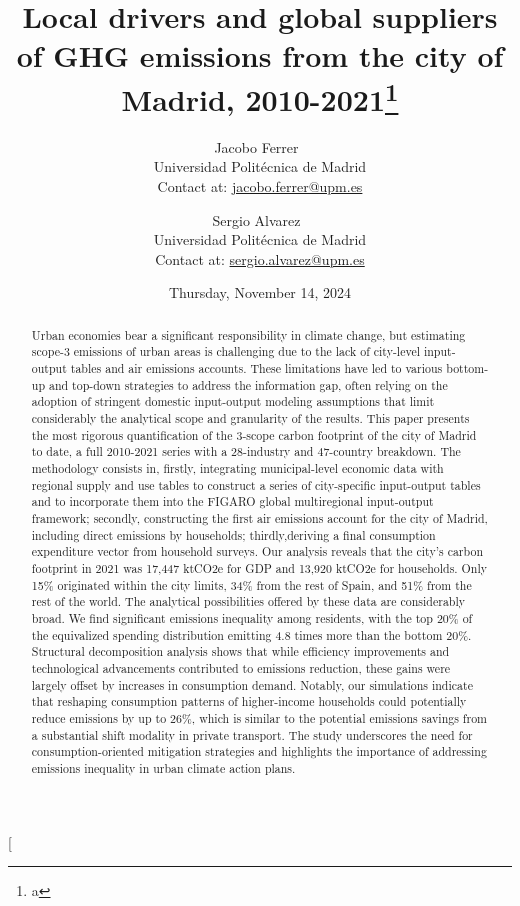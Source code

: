 \documentclass[
  10pt,
  twocolumn]{aft}
\title{Local drivers and global suppliers of GHG emissions from the city
of Madrid, 2010-2021\footnote{a}}
\author{
Jacobo Ferrer~\orcidlink{0000-0002-7873-6275}\\Universidad Politécnica
de
Madrid\\Contact at: \href{mailto:jacobo.ferrer@upm.es}{jacobo.ferrer@upm.es}\\\and 
Sergio Alvarez~\orcidlink{0000-0001-7204-502X}\\Universidad Politécnica
de
Madrid\\Contact at: \href{mailto:sergio.alvarez@upm.es}{sergio.alvarez@upm.es}\\}
\date{Thursday, November 14, 2024}
\begin{document}
\makeatletter
\twocolumn[
\maketitle

\begin{@twocolumnfalse}

\centering\begin{minipage}{\dimexpr\paperwidth-6.5cm}
\begin{abstract}
\begin{normalsize}
\vspace{1em}
Urban economies bear a significant responsibility in climate change, but estimating scope-3 emissions of urban areas is challenging due to the lack of city-level input-output tables and air emissions accounts. These limitations have led to various bottom-up and top-down strategies to address the information gap, often relying on the adoption of stringent domestic input-output modeling assumptions that limit considerably the analytical scope and granularity of the results. This paper presents the most rigorous quantification of the 3-scope carbon footprint of the city of Madrid to date, a full 2010-2021 series with a 28-industry and 47-country breakdown. The methodology consists in, firstly, integrating municipal-level economic data with regional supply and use tables to construct a series of city-specific input-output tables and to incorporate them into the FIGARO global multiregional input-output framework; secondly, constructing the first air emissions account for the city of Madrid, including direct emissions by households; thirdly,deriving a final consumption expenditure vector from household surveys. Our analysis reveals that the city's carbon footprint in 2021 was 17,447 ktCO2e for GDP and 13,920 ktCO2e for households. Only 15\% originated within the city limits, 34\% from the rest of Spain, and 51\% from the rest of the world. The analytical possibilities offered by these data are considerably broad. We find significant emissions inequality among residents, with the top 20\% of the equivalized spending distribution emitting 4.8 times more than the bottom 20\%. %
Structural decomposition analysis shows that while efficiency improvements and technological advancements contributed to emissions reduction, these gains were largely offset by increases in consumption demand. 
Notably, our simulations indicate that reshaping consumption patterns of higher-income households could potentially reduce emissions by up to 26\%, which is similar to the potential emissions savings from a substantial shift modality in private transport. The study underscores the need for consumption-oriented mitigation strategies and highlights the importance of addressing emissions inequality in urban climate action plans.

\end{normalsize}
\end{abstract}
\end{minipage}
\end{@twocolumnfalse}
\end{document}
